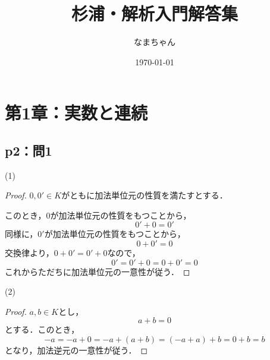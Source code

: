 \documentclass[uplatex,dvipdfmx,a4paper,10pt,fleqn]{jsarticle}
\begin{document}
\title{杉浦・解析入門解答集}
\author{なまちゃん}
\date{\today}
\maketitle
\begin{multicols*}{3}
    \tableofcontents
\end{multicols*}
\newpage
\section*{第1章：実数と連続}

\subsection*{p2：問1}

\begin{itembox}[c]{(1)}
    \begin{proof}
$0,0' \in K$がともに加法単位元の性質を満たすとする．

このとき，$0$が加法単位元の性質をもつことから，
\[
    0'+0=0'
\]
同様に，$0'$が加法単位元の性質をもつことから，
\[
    0+0' = 0
\]
交換律より，$0+0'=0'+0$なので，
\[
    0'=0'+0 =0+0' =0
\]
これからただちに加法単位元の一意性が従う．
    \end{proof}
    \end{itembox}
    \begin{itembox}[c]{(2)}
        \begin{proof}
$a ,b \in K$とし，
\[
    a+b =0
\]
とする．このとき，
\[
    -a = -a+0 = -a +(a+b)=(-a+a)+b =0+b = b
\]
となり，加法逆元の一意性が従う．
        \end{proof}
    \end{itembox}
\end{document}

